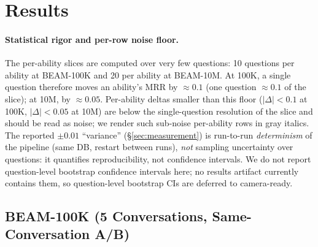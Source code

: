 \documentclass[11pt]{article}
\begin{document}
\section{Results}
\label{sec:results}

\paragraph{Statistical rigor and per-row noise floor.}
The per-ability slices are computed over very few questions: 10
questions per ability at BEAM-100K and 20 per ability at BEAM-10M.
At 100K, a single question therefore moves an ability's MRR by
$\approx 0.1$ (one question $\approx 0.1$ of the slice); at 10M, by
$\approx 0.05$.  Per-ability deltas smaller than this floor
($|\Delta| < 0.1$ at 100K, $|\Delta| < 0.05$ at 10M) are below the
single-question resolution of the slice and should be read as noise;
we render such sub-noise per-ability rows in gray italics.  The
reported $\pm 0.01$ ``variance'' (\S\ref{sec:measurement}) is
run-to-run \emph{determinism} of the pipeline (same DB, restart
between runs), \emph{not} sampling uncertainty over questions: it
quantifies reproducibility, not confidence intervals.  We do not
report question-level bootstrap confidence intervals here; no results
artifact currently contains them, so question-level bootstrap CIs are
deferred to camera-ready.

\subsection{BEAM-100K (5 Conversations, Same-Conversation A/B)}
\label{sec:results-100k}
\end{document}

